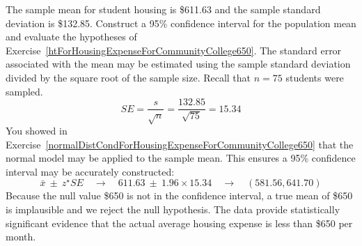 \begin{example}{The sample mean for student housing is \$611.63 and the sample standard deviation is \$132.85. Construct a 95\% confidence interval for the population mean and evaluate the hypotheses of Exercise~\ref{htForHousingExpenseForCommunityCollege650}.}
The standard error associated with the mean may be estimated using the sample standard deviation divided by the square root of the sample size. Recall that $n=75$ students were sampled.
$$ SE = \frac{s}{\sqrt{n}} = \frac{132.85}{\sqrt{75}} = 15.34 $$
You showed in Exercise~\ref{normalDistCondForHousingExpenseForCommunityCollege650} that the normal model may be applied to the sample mean. This ensures a 95\% confidence interval may be accurately constructed:
$$\bar{x}\ \pm\ z^{\star} SE \quad\to\quad 611.63\ \pm\ 1.96 \times  15.34 \quad \to \quad (581.56, 641.70) $$
Because the null value \$650 is not in the confidence interval, a true mean of \$650 is implausible and we reject the null hypothesis. The data provide statistically significant evidence that the actual average housing expense is less than \$650 per month.
\end{example}

